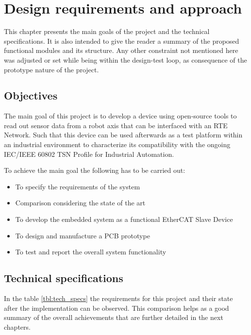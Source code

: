 \chapter{Design requirements and approach}\label{cha:solution}

This chapter presents the main goals of the project and the technical specifications. It is also 
intended to give the reader a summary of the proposed functional modules and its structure. 
Any other constraint not mentioned here 
was adjusted or set while being within the design-test loop, as consequence of the prototype nature of the project.
\section{Objectives}
The main goal of this project is to develop a device using open-source tools to read out sensor data from a robot
axis that can be interfaced with an RTE Network. Such that this device can be used afterwards as a test platform 
within an industrial environment to characterize its compatibility with the ongoing IEC/IEEE 60802
TSN Profile for Industrial Automation.

To achieve the main goal the following has to be carried out:
\begin{itemize}
  \item To specify the requirements of the system
  \item Comparison considering the state of the art
  \item To develop the embedded system as a functional EtherCAT Slave Device
  \item To design and manufacture a PCB prototype
  \item To test and report the overall system functionality
\end{itemize}

\section{Technical specifications}

In the table \ref{tbl:tech_specs} the requirements for this project and their state after the implementation can be observed.
This comparison helps as a good summary of the overall achievements that are further detailed in the next chapters.

